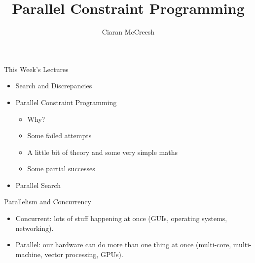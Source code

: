 \documentclass{beamer}
\title{Parallel Constraint Programming}
\author[Ciaran McCreesh]{\textcolor{uofgblue}{Ciaran McCreesh}}
\begin{document}
{
    \begin{frame}
        \titlepage
    \end{frame}
}

\begin{frame}{This Week's Lectures}
    \begin{itemize}
        \item Search and Discrepancies
        \item \textcolor{uofgblue}{Parallel Constraint Programming}
            \begin{itemize}
                \item Why?
                \item Some failed attempts
                \item A little bit of theory and some very simple maths
                \item Some partial successes
            \end{itemize}
        \item Parallel Search
    \end{itemize}
\end{frame}

\begin{frame}{Parallelism and Concurrency}
    \begin{itemize}
        \item Concurrent: lots of stuff happening at once (GUIs, operating systems, networking).

        \item Parallel: our hardware can do more than one thing at once (multi-core, multi-machine,
            vector processing, GPUs).
    \end{itemize}
\end{frame}
\end{document}
